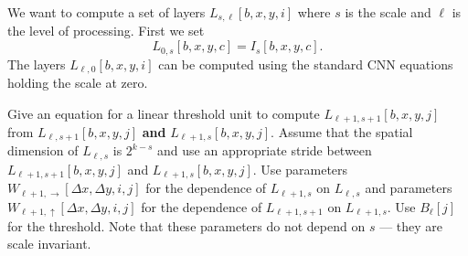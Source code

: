 \documentclass{article}
\begin{document}
We want to compute a set of layers $L_{s,\ell}[b,x,y,i]$ where $s$ is the scale and $\ell$ is the level of processing.  First we set
$$L_{0,s}[b,x,y,c] = I_s[b,x,y,c].$$
The layers $L_{\ell,0}[b,x,y,i]$ can be computed using the standard CNN equations holding the scale at zero.

\medskip
Give an equation for a linear threshold unit to compute $L_{\ell+1,s+1}[b,x,y,j]$ from $L_{\ell,s+1}[b,x,y,j]$ {\bf and} $L_{\ell+1,s}[b,x,y,j]$.  Assume that the
spatial dimension of $L_{\ell,s}$ is $2^{k-s}$ and use an appropriate stride between $L_{\ell+1,s+1}[b,x,y,j]$ and $L_{\ell+1,s}[b,x,y,j]$.  Use parameters
$W_{\ell+1,\rightarrow}[\Delta x, \Delta y, i,j]$ for the dependence of $L_{\ell+1,s}$ on $L_{\ell,s}$ and
parameters
$W_{\ell+1,\uparrow}[\Delta x, \Delta y, i,j]$ for the dependence of $L_{\ell+1,s+1}$ on $L_{\ell+1,s}$.  Use $B_\ell[j]$ for the threshold.
Note that these parameters do not depend on $s$ --- they are scale invariant.
\end{document}
